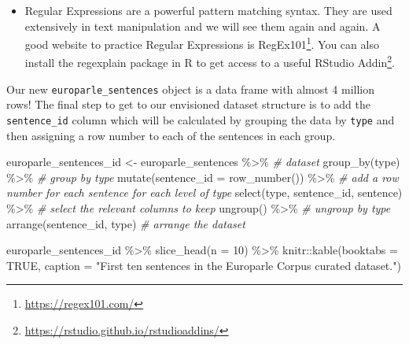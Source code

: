 \documentclass[
]{article}
\newenvironment{Shaded}{\begin{snugshade}}{\end{snugshade}}
\newcommand{\AttributeTok}[1]{\textcolor[rgb]{0.77,0.63,0.00}{#1}}
\newcommand{\CommentTok}[1]{\textcolor[rgb]{0.56,0.35,0.01}{\textit{#1}}}
\newcommand{\ConstantTok}[1]{\textcolor[rgb]{0.00,0.00,0.00}{#1}}
\newcommand{\DecValTok}[1]{\textcolor[rgb]{0.00,0.00,0.81}{#1}}
\newcommand{\FunctionTok}[1]{\textcolor[rgb]{0.00,0.00,0.00}{#1}}
\newcommand{\NormalTok}[1]{#1}
\newcommand{\OtherTok}[1]{\textcolor[rgb]{0.56,0.35,0.01}{#1}}
\newcommand{\SpecialCharTok}[1]{\textcolor[rgb]{0.00,0.00,0.00}{#1}}
\newcommand{\StringTok}[1]{\textcolor[rgb]{0.31,0.60,0.02}{#1}}
\DeclareRobustCommand{\href}[2]{#2\footnote{\url{#1}}}
\newenvironment{rmdblock}[1]
  {\begin{shaded*}
  \begin{itemize}
  \renewcommand{\labelitemi}{
    \raisebox{-.5\height}[0pt][0pt]{
      {\setkeys{Gin}{width=2em,keepaspectratio}\texttt{[image: assets/images/\#1]}}
    }
  }
  \item
  }
  {
  \end{itemize}
  \end{shaded*}
  }
\newenvironment{rmdtip}
  {\begin{rmdblock}{tip}}
  {\end{rmdblock}}
\begin{document}
\begin{rmdtip}
Regular Expressions are a powerful pattern matching syntax. They are
used extensively in text manipulation and we will see them again and
again. A good website to practice Regular Expressions is
\href{https://regex101.com/}{RegEx101}. You can also install the
regexplain package in R to get access to a useful
\href{https://rstudio.github.io/rstudioaddins/}{RStudio Addin}.
\end{rmdtip}

Our new \texttt{europarle\_sentences} object is a data frame with almost 4 million rows! The final step to get to our envisioned dataset structure is to add the \texttt{sentence\_id} column which will be calculated by grouping the data by \texttt{type} and then assigning a row number to each of the sentences in each group.

\begin{Shaded}
\begin{Highlighting}[]
\NormalTok{europarle\_sentences\_id }\OtherTok{\textless{}{-}} 
\NormalTok{  europarle\_sentences }\SpecialCharTok{\%\textgreater{}\%} \CommentTok{\# dataset}
  \FunctionTok{group\_by}\NormalTok{(type) }\SpecialCharTok{\%\textgreater{}\%} \CommentTok{\# group by type}
  \FunctionTok{mutate}\NormalTok{(}\AttributeTok{sentence\_id =} \FunctionTok{row\_number}\NormalTok{()) }\SpecialCharTok{\%\textgreater{}\%} \CommentTok{\# add a row number for each sentence for each level of type}
  \FunctionTok{select}\NormalTok{(type, sentence\_id, sentence) }\SpecialCharTok{\%\textgreater{}\%} \CommentTok{\# select the relevant columns to keep}
  \FunctionTok{ungroup}\NormalTok{() }\SpecialCharTok{\%\textgreater{}\%}  \CommentTok{\# ungroup by type}
  \FunctionTok{arrange}\NormalTok{(sentence\_id, type) }\CommentTok{\# arrange the dataset}

\NormalTok{europarle\_sentences\_id }\SpecialCharTok{\%\textgreater{}\%} 
  \FunctionTok{slice\_head}\NormalTok{(}\AttributeTok{n =} \DecValTok{10}\NormalTok{) }\SpecialCharTok{\%\textgreater{}\%} 
\NormalTok{  knitr}\SpecialCharTok{::}\FunctionTok{kable}\NormalTok{(}\AttributeTok{booktabs =} \ConstantTok{TRUE}\NormalTok{,}
        \AttributeTok{caption =} \StringTok{"First ten sentences in the Europarle Corpus curated dataset."}\NormalTok{)}
\end{Highlighting}
\end{Shaded}
\end{document}
